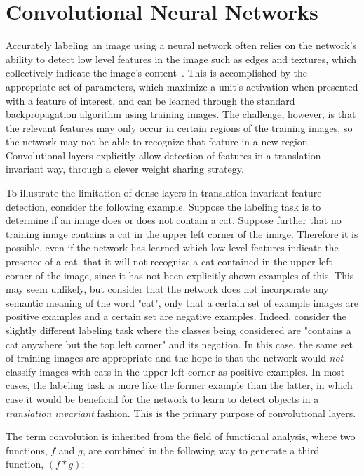 \section{Convolutional Neural Networks}

Accurately labeling an image using a neural network often relies on the network's ability to detect low level features in the image such as edges and textures, which collectively indicate the image's content~\cite{ng2011}.
This is accomplished by the appropriate set of parameters, which maximize a unit's activation when presented with a feature of interest, and can be learned through the standard backpropagation algorithm using training images. 
The challenge, however, is that the relevant features may only occur in certain regions of the training images, so the network may not be able to recognize that feature in a new region.
Convolutional layers explicitly allow detection of features in a translation invariant way, through a clever weight sharing strategy.

To illustrate the limitation of dense layers in translation invariant feature detection, consider the following example.
Suppose the labeling task is to determine if an image does or does not contain a cat.
Suppose further that no training image contains a cat in the upper left corner of the image.
Therefore it is possible, even if the network has learned which low level features indicate the presence of a cat, that it will not recognize a cat contained in the upper left corner of the image, since it has not been explicitly shown examples of this.
This may seem unlikely, but consider that the network does not incorporate any semantic meaning of the word "cat", only that a certain set of example images are positive examples and a certain set are negative examples.
Indeed, consider the slightly different labeling task where the classes being considered are "contains a cat anywhere but the top left corner" and its negation.
In this case, the same set of training images are appropriate and the hope is that the network would \textit{not} classify images with cats in the upper left corner as positive examples.
In most cases, the labeling task is more like the former example than the latter, in which case it would be beneficial for the network to learn to detect objects in a \textit{translation invariant} fashion. 
This is the primary purpose of convolutional layers.

The term convolution is inherited from the field of functional analysis, where two functions, $f$ and $g$, are combined in the following way to generate a third function, $(f*g)$:

